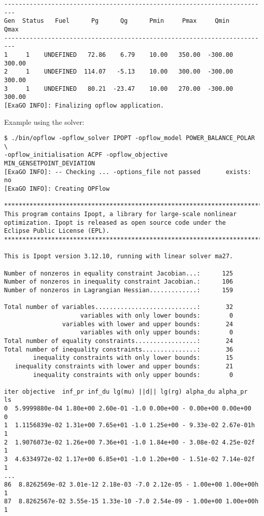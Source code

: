 \begin{lstlisting}
-------------------------------------------------------------------------
Gen  Status   Fuel      Pg      Qg      Pmin     Pmax     Qmin     Qmax
-------------------------------------------------------------------------
1     1    UNDEFINED   72.86    6.79    10.00   350.00  -300.00   300.00
2     1    UNDEFINED  114.07   -5.13    10.00   300.00  -300.00   300.00
3     1    UNDEFINED   80.21  -23.47    10.00   270.00  -300.00   300.00
[ExaGO INFO]: Finalizing opflow application.
\end{lstlisting}

Example using the \ipopt solver:

\begin{lstlisting}
$ ./bin/opflow -opflow_solver IPOPT -opflow_model POWER_BALANCE_POLAR \
-opflow_initialisation ACPF -opflow_objective MIN_GENSETPOINT_DEVIATION
[ExaGO INFO]: -- Checking ... -options_file not passed       exists: no
[ExaGO INFO]: Creating OPFlow

*************************************************************************
This program contains Ipopt, a library for large-scale nonlinear 
optimization. Ipopt is released as open source code under the 
Eclipse Public License (EPL).
*************************************************************************

This is Ipopt version 3.12.10, running with linear solver ma27.

Number of nonzeros in equality constraint Jacobian...:      125
Number of nonzeros in inequality constraint Jacobian.:      106
Number of nonzeros in Lagrangian Hessian.............:      159

Total number of variables............................:       32
                     variables with only lower bounds:        0
                variables with lower and upper bounds:       24
                     variables with only upper bounds:        0
Total number of equality constraints.................:       24
Total number of inequality constraints...............:       36
        inequality constraints with only lower bounds:       15
   inequality constraints with lower and upper bounds:       21
        inequality constraints with only upper bounds:        0

iter objective  inf_pr inf_du lg(mu) ||d|| lg(rg) alpha_du alpha_pr  ls
0  5.9999880e-04 1.80e+00 2.60e-01 -1.0 0.00e+00 - 0.00e+00 0.00e+00  0
1  1.1156839e-02 1.31e+00 7.65e+01 -1.0 1.25e+00 - 9.33e-02 2.67e-01h 1
2  1.9076073e-02 1.26e+00 7.36e+01 -1.0 1.84e+00 - 3.08e-02 4.25e-02f 1
3  4.6334972e-02 1.17e+00 6.85e+01 -1.0 1.20e+00 - 1.51e-02 7.14e-02f 1
...
86  8.8262569e-02 3.01e-12 2.18e-03 -7.0 2.12e-05 - 1.00e+00 1.00e+00h 1
87  8.8262567e-02 3.55e-15 1.33e-10 -7.0 2.54e-09 - 1.00e+00 1.00e+00h 1


\end{lstlisting}
